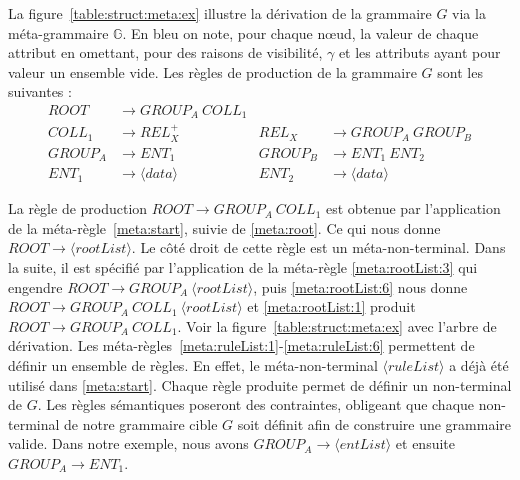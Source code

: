 \begin{example}
    \label{ex:struct:meta}
    La figure~\ref{table:struct:meta:ex} illustre la dérivation de la grammaire $G$ via la méta-grammaire $\mathbb{G}$.
    En bleu on note, pour chaque nœud, la valeur de chaque attribut en omettant, pour des raisons de visibilité, $\gamma$ et les attributs ayant pour valeur un ensemble vide.
    Les règles de production de la grammaire $G$ sont les suivantes :
    \begin{align*}
        ROOT    & \to GROUP_A ~ COLL_1                                          \\
        COLL_1  & \to REL_X^+              & REL_X   & \to GROUP_A ~ GROUP_B    \\
        GROUP_A & \to ENT_1                & GROUP_B & \to ENT_1 ~ ENT_2        \\
        ENT_1   & \to \langle data \rangle & ENT_2   & \to \langle data \rangle
    \end{align*}

    La règle de production $ROOT \rightarrow GROUP_A ~ COLL_1$ est obtenue par l'application de la méta-règle~\ref{meta:start}, suivie de \ref{meta:root}.
    Ce qui nous donne $ROOT \rightarrow \langle rootList \rangle$.
    Le côté droit de cette règle est un méta-non-terminal.
    Dans la suite, il est spécifié par l'application de la méta-règle \ref{meta:rootList:3} qui engendre $ROOT \rightarrow GROUP_A ~ \langle rootList \rangle$, puis \ref{meta:rootList:6} nous donne $ROOT \rightarrow GROUP_A ~ COLL_1 ~ \langle rootList \rangle$ et \ref{meta:rootList:1} produit $ROOT \rightarrow GROUP_A ~ COLL_1$.
    Voir la figure~\ref{table:struct:meta:ex} avec l'arbre de dérivation.
    Les méta-règles~\ref{meta:ruleList:1}-\ref{meta:ruleList:6} permettent de définir un ensemble de règles.
    En effet, le méta-non-terminal $\langle ruleList \rangle$ a déjà été utilisé dans \ref{meta:start}.
    Chaque règle produite permet de définir un non-terminal de $G$.
    Les règles sémantiques poseront des contraintes, obligeant que chaque non-terminal de notre grammaire cible $G$ soit définit afin de construire une grammaire valide.
    Dans notre exemple, nous avons $GROUP_A \rightarrow  \langle entList \rangle$ et ensuite $GROUP_A \rightarrow ENT_1$.
\end{example}

